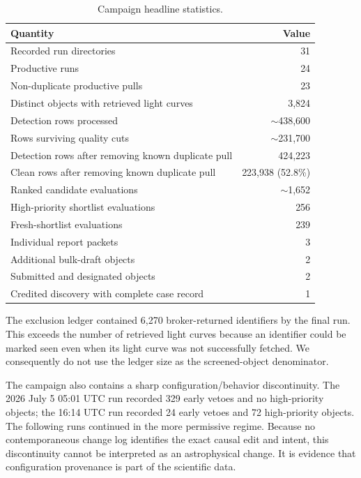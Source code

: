 \documentclass[11pt]{article}
\begin{document}
\begin{table}[ht]
\centering
\caption{Campaign headline statistics.}
\label{tab:headline}
\begin{tabular}{lr}
\toprule
Quantity & Value \\
\midrule
Recorded run directories & 31 \\
Productive runs & 24 \\
Non-duplicate productive pulls & 23 \\
Distinct objects with retrieved light curves & 3,824 \\
Detection rows processed & $\sim$438,600 \\
Rows surviving quality cuts & $\sim$231,700 \\
Detection rows after removing known duplicate pull & 424,223 \\
Clean rows after removing known duplicate pull & 223,938 (52.8\%) \\
Ranked candidate evaluations & $\sim$1,652 \\
High-priority shortlist evaluations & 256 \\
Fresh-shortlist evaluations & 239 \\
Individual report packets & 3 \\
Additional bulk-draft objects & 2 \\
Submitted and designated objects & 2 \\
Credited discovery with complete case record & 1 \\
\bottomrule
\end{tabular}
\end{table}

The exclusion ledger contained 6,270 broker-returned identifiers by the final run. This exceeds the number of retrieved light curves because an identifier could be marked seen even when its light curve was not successfully fetched. We consequently do not use the ledger size as the screened-object denominator.

The campaign also contains a sharp configuration/behavior discontinuity. The 2026 July 5 05:01 UTC run recorded 329 early vetoes and no high-priority objects; the 16:14 UTC run recorded 24 early vetoes and 72 high-priority objects. The following runs continued in the more permissive regime. Because no contemporaneous change log identifies the exact causal edit and intent, this discontinuity cannot be interpreted as an astrophysical change. It is evidence that configuration provenance is part of the scientific data.
\end{document}
